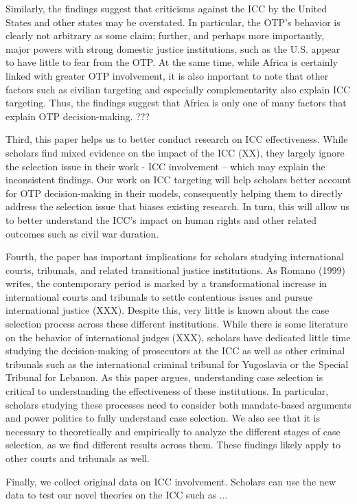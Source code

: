 Similarly, the findings suggest that criticisms against the ICC by the United States and other states may be overstated. In particular, the OTP's behavior is clearly not arbitrary as some claim; further, and perhaps more importantly, major powers with strong domestic justice institutions, such as the U.S. appear to have little to fear from the OTP. At the same time, while Africa is certainly linked with greater OTP involvement, it is also important to note that other factors such as civilian targeting and especially complementarity also explain ICC targeting. Thus, the findings suggest that Africa is only one of many factors that explain OTP decision-making. ???

Third, this paper helps us to better conduct research on ICC effectiveness. While scholars find mixed evidence on the impact of the ICC (XX), they largely ignore the selection issue in their work - ICC involvement -- which may explain the inconsistent findings. Our work on ICC targeting will help scholars better account for OTP decision-making in their models, consequently helping them to directly address the selection issue that biases existing research. In turn, this will allow us to better understand the ICC's impact on human rights and other related outcomes such as civil war duration.

Fourth, the paper has important implications for scholars studying international courts, tribunals, and related transitional justice institutions. As Romano (1999) writes, the contemporary period is marked by a transformational increase in international courts and tribunals to settle contentious issues and pursue international justice (XXX). Despite this, very little is known about the case selection process across these different institutions. While there is some literature on the behavior of international judges (XXX), scholars have dedicated little time studying the decision-making of prosecutors at the ICC as well as other criminal tribunals such as the international criminal tribunal for Yugoslavia or the Special Tribunal for Lebanon. As this paper argues, understanding case selection is critical to understanding the effectiveness of these institutions. In particular, scholars studying these processes need to consider both mandate-based arguments and power politics to fully understand case selection. We also see that it is necessary to theoretically and empirically to analyze the different stages of case selection, as we find different results across them. These findings likely apply to other courts and tribunals as well.

Finally, we collect original data on ICC involvement. Scholars can use the new data to test our novel theories on the ICC such as ...
